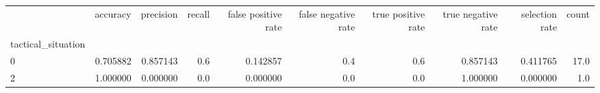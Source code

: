 \begin{tabular}{lrrrrrrrrr}
\toprule
{} &  accuracy &  precision &  recall &  false positive rate &  false negative rate &  true positive rate &  true negative rate &  selection rate &  count \\
tactical\_situation &           &            &         &                      &                      &                     &                     &                 &        \\
\midrule
0                  &  0.705882 &   0.857143 &     0.6 &             0.142857 &                  0.4 &                 0.6 &            0.857143 &        0.411765 &   17.0 \\
2                  &  1.000000 &   0.000000 &     0.0 &             0.000000 &                  0.0 &                 0.0 &            1.000000 &        0.000000 &    1.0 \\
\bottomrule
\end{tabular}
